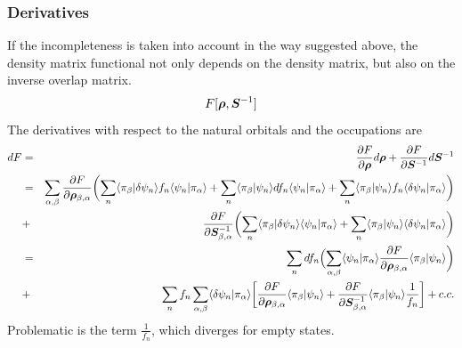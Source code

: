 \documentclass[11pt,a4paper]{report}
\begin{document}

\subsubsection{Derivatives}
If the incompleteness is taken into account in the way suggested
above, the density matrix functional not only depends on the density
matrix, but also on the inverse overlap matrix.
\begin{eqnarray}
F[\bm{\rho},\bm{S}^{-1}]
\end{eqnarray}
The derivatives with respect to the natural orbitals and the
occupations are
\begin{eqnarray}
dF&=&
\frac{\partial F}{\partial\bm{\rho}}d\bm{\rho}
+\frac{\partial F}{\partial\bm{S}^{-1}}d\bm{S}^{-1}
\nonumber\\
&=&
\sum_{\alpha,\beta}
\frac{\partial F}{\partial\bm{\rho}_{\beta,\alpha}}
\biggl(
\sum_n\langle\pi_\beta|\delta\psi_n\rangle f_n\langle\psi_n|\pi_\alpha\rangle
+\sum_n\langle\pi_\beta|\psi_n\rangle df_n\langle\psi_n|\pi_\alpha\rangle
+\sum_n\langle\pi_\beta|\psi_n\rangle f_n\langle\delta\psi_n|\pi_\alpha\rangle
\biggr)
\nonumber\\
&+&\frac{\partial F}{\partial\bm{S}^{-1}_{\beta,\alpha}}
\biggl(
\sum_n\langle\pi_\beta|\delta\psi_n\rangle\langle\psi_n|\pi_\alpha\rangle
+\sum_n\langle\pi_\beta|\psi_n\rangle\langle\delta\psi_n|\pi_\alpha\rangle
\biggr)
\nonumber\\
&=&
\sum_n df_n
\Bigl(\sum_{\alpha,\beta}
\langle\psi_n|\pi_\alpha\rangle
\frac{\partial F}{\partial\bm{\rho}_{\beta,\alpha}}
\langle\pi_\beta|\psi_n\rangle\biggr)
\nonumber\\
&+&\sum_n f_n\sum_{\alpha,\beta}\langle\delta\psi_n|\pi_\alpha\rangle
\biggl[
\frac{\partial F}{\partial\bm{\rho}_{\beta,\alpha}}\langle\pi_\beta|\psi_n\rangle
+\frac{\partial F}{\partial\bm{S}^{-1}_{\beta,\alpha}}
\langle\pi_\beta|\psi_n\rangle\frac{1}{f_n}\biggr]+c.c.
\end{eqnarray}
Problematic is the term $\frac{1}{f_n}$, which diverges for empty
states.
\end{document}
